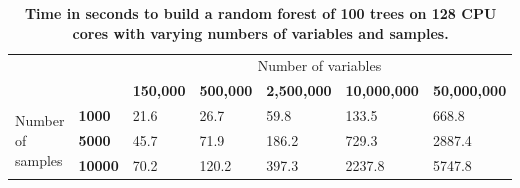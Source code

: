 \documentclass[10pt,letterpaper]{article}
\begin{document}

\begin{table}[!ht]
\begin{adjustwidth}{-1.00in}{0in}
\centering
\caption{\textbf{
 Time in seconds to build a random forest of 100
  trees on 128 CPU cores with varying numbers of variables and samples.}}
\label{synthetictimingtable}
\begin{tabular}{|l|l|l|l|l|l|l|}
\hline
\multicolumn{2}{|l|}{\multirow{2}{*}{}}           & \multicolumn{5}{c|}{Number of variables} \\
\cline{3-7}
\multicolumn{2}{|l|}{}                               & \bf{150,000} & \bf{500,000} & \bf{2,500,000}  & \bf{10,000,000} & \bf{50,000,000} \\
\hline                                                            
\multirow{4}{*}{Number of samples}      & \bf{1000}  & 21.6  & 26.7  & 59.8  & 133.5  & 668.8 \\
                                        & \bf{5000}  & 45.7  & 71.9  & 186.2 & 729.3  & 2887.4 \\
                                        & \bf{10000} & 70.2  & 120.2 & 397.3 & 2237.8 & 5747.8 \\
\hline
\end{tabular}
\end{adjustwidth}
\end{table}
\end{document}
